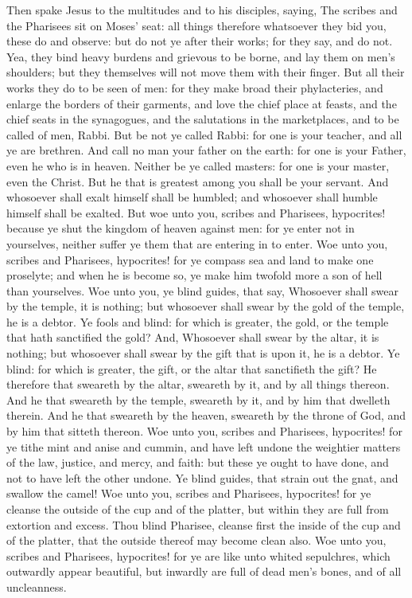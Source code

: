 Then spake Jesus to the multitudes and to his disciples, saying, The scribes and the Pharisees sit on Moses’ seat: all things therefore whatsoever they bid you, these do and observe: but do not ye after their works; for they say, and do not. Yea, they bind heavy burdens and grievous to be borne, and lay them on men’s shoulders; but they themselves will not move them with their finger. But all their works they do to be seen of men: for they make broad their phylacteries, and enlarge the borders of their garments, and love the chief place at feasts, and the chief seats in the synagogues, and the salutations in the marketplaces, and to be called of men, Rabbi. But be not ye called Rabbi: for one is your teacher, and all ye are brethren. And call no man your father on the earth: for one is your Father, even he who is in heaven. Neither be ye called masters: for one is your master, even the Christ. But he that is greatest among you shall be your servant. And whosoever shall exalt himself shall be humbled; and whosoever shall humble himself shall be exalted.  But woe unto you, scribes and Pharisees, hypocrites! because ye shut the kingdom of heaven against men: for ye enter not in yourselves, neither suffer ye them that are entering in to enter.   Woe unto you, scribes and Pharisees, hypocrites! for ye compass sea and land to make one proselyte; and when he is become so, ye make him twofold more a son of hell than yourselves.  Woe unto you, ye blind guides, that say, Whosoever shall swear by the temple, it is nothing; but whosoever shall swear by the gold of the temple, he is a debtor. Ye fools and blind: for which is greater, the gold, or the temple that hath sanctified the gold? And, Whosoever shall swear by the altar, it is nothing; but whosoever shall swear by the gift that is upon it, he is a debtor. Ye blind: for which is greater, the gift, or the altar that sanctifieth the gift? He therefore that sweareth by the altar, sweareth by it, and by all things thereon. And he that sweareth by the temple, sweareth by it, and by him that dwelleth therein. And he that sweareth by the heaven, sweareth by the throne of God, and by him that sitteth thereon.  Woe unto you, scribes and Pharisees, hypocrites! for ye tithe mint and anise and cummin, and have left undone the weightier matters of the law, justice, and mercy, and faith: but these ye ought to have done, and not to have left the other undone. Ye blind guides, that strain out the gnat, and swallow the camel!  Woe unto you, scribes and Pharisees, hypocrites! for ye cleanse the outside of the cup and of the platter, but within they are full from extortion and excess. Thou blind Pharisee, cleanse first the inside of the cup and of the platter, that the outside thereof may become clean also.  Woe unto you, scribes and Pharisees, hypocrites! for ye are like unto whited sepulchres, which outwardly appear beautiful, but inwardly are full of dead men’s bones, and of all uncleanness. 